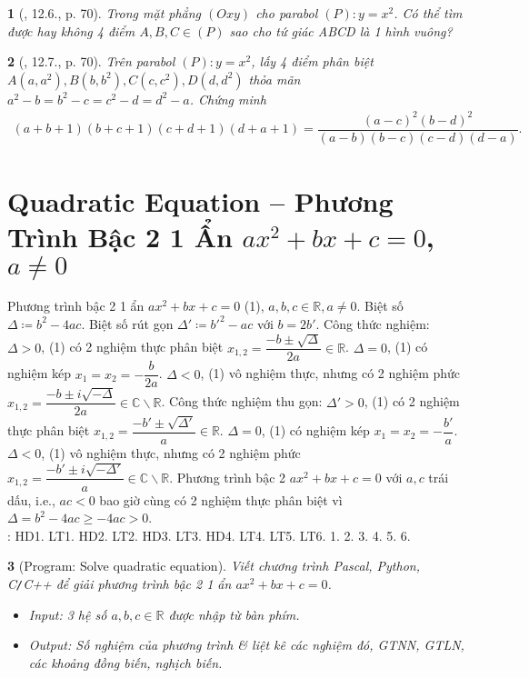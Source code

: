 \documentclass{article}
\newtheorem{baitoan}{}
\begin{document}
\begin{baitoan}[\cite{TLCT_THCS_Toan_9_dai_so}, 12.6., p. 70]
	Trong mặt phẳng $(Oxy)$ cho parabol $(P): y = x^2$. Có thể tìm được hay không 4 điểm $A,B,C\in(P)$ sao cho tứ giác ABCD là 1 hình vuông?
\end{baitoan}

\begin{baitoan}[\cite{TLCT_THCS_Toan_9_dai_so}, 12.7., p. 70]
	Trên parabol $(P): y = x^2$, lấy 4 điểm phân biệt $A(a,a^2),B(b,b^2),C(c,c^2),D(d,d^2)$ thỏa mãn $a^2 - b = b^2 - c = c^2 - d = d^2 - a$. Chứng minh
	\begin{align*}
		(a + b + 1)(b + c + 1)(c + d + 1)(d + a + 1) = \dfrac{(a - c)^2(b - d)^2}{(a - b)(b - c)(c - d)(d - a)}.
	\end{align*}
\end{baitoan}


\section{Quadratic Equation -- Phương Trình Bậc 2 1 Ẩn $ax^2 + bx + c = 0$, $a\ne0$}
 Phương trình bậc 2 1 ẩn $ax^2 + bx + c = 0$ (1), $a,b,c\in\mathbb{R},a\ne0$. Biệt số $\Delta\coloneqq b^2 - 4ac$. Biệt số rút gọn $\Delta'\coloneqq b'^2 - ac$ với $b = 2b'$.  Công thức nghiệm: $\Delta > 0$, (1) có 2 nghiệm thực phân biệt $x_{1,2} = \dfrac{-b\pm\sqrt{\Delta}}{2a}\in\mathbb{R}$. $\Delta = 0$, (1) có nghiệm kép $x_1 = x_2 = -\dfrac{b}{2a}$. $\Delta < 0$, (1) vô nghiệm thực, nhưng có 2 nghiệm phức $x_{1,2} = \dfrac{-b\pm i\sqrt{-\Delta}}{2a}\in\mathbb{C}\backslash\mathbb{R}$.  Công thức nghiệm thu gọn: $\Delta' > 0$, (1) có 2 nghiệm thực phân biệt $x_{1,2} = \dfrac{-b'\pm\sqrt{\Delta'}}{a}\in\mathbb{R}$. $\Delta = 0$, (1) có nghiệm kép $x_1 = x_2 = -\dfrac{b'}{a}$. $\Delta < 0$, (1) vô nghiệm thực, nhưng có 2 nghiệm phức $x_{1,2} = \dfrac{-b'\pm i\sqrt{-\Delta'}}{a}\in\mathbb{C}\backslash\mathbb{R}$.  Phương trình bậc 2 $ax^2 + bx + c = 0$ với $a,c$ trái dấu, i.e., $ac < 0$ bao giờ cùng có 2 nghiệm thực phân biệt vì $\Delta = b^2 - 4ac\ge-4ac > 0$.\\

\noindent\cite[Chap. VII, \S2, pp. 52--60]{SGK_Toan_9_Canh_Dieu_tap_2}: HD1. LT1. HD2. LT2. HD3. LT3. HD4. LT4. LT5. LT6. 1. 2. 3. 4. 5. 6.

\begin{baitoan}[{\sf Program}: Solve quadratic equation]
	Viết chương trình {\sf Pascal, Python, C{\tt/}C++} để giải phương trình bậc 2 1 ẩn $ax^2 + bx + c = 0$.
	\begin{itemize}
		\item {\sf Input}: 3 hệ số $a,b,c\in\mathbb{R}$ được nhập từ bàn phím.
		\item {\sf Output}: Số nghiệm của phương trình \& liệt kê các nghiệm đó, {\rm GTNN, GTLN}, các khoảng đồng biến, nghịch biến.
	\end{itemize}
\end{baitoan}
\end{document}
